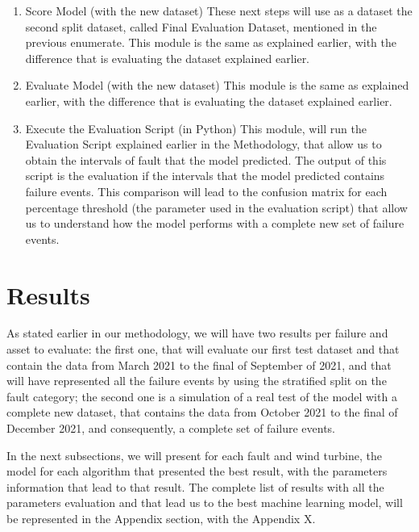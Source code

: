 \begin{enumerate}
    \item{Score Model (with the new dataset)}
These next steps will use as a dataset the second split dataset, called Final Evaluation Dataset, mentioned in the previous enumerate.
This module is the same as explained earlier, with the difference that is evaluating the dataset explained earlier.

    \item{Evaluate Model (with the new dataset)}
This module is the same as explained earlier, with the difference that is evaluating the dataset explained earlier.
    
    \item{Execute the Evaluation Script (in Python)}
This module, will run the Evaluation Script explained earlier in the Methodology, that allow us to obtain the intervals of fault that the model predicted. The output of this script is the evaluation if the intervals that the model predicted contains failure events. This comparison will lead to the confusion matrix for each percentage threshold (the parameter used in the evaluation script) that allow us to understand how the model performs with a complete new set of failure events.
\end{enumerate}



\section{Results}

As stated earlier in our methodology, we will have two results per failure and asset to evaluate: the first one, that will evaluate our first test dataset and that contain the data from March 2021 to the final of September of 2021, and that will have represented all the failure events by using the stratified split on the fault category; the second one is a simulation of a real test of the model with a complete new dataset, that contains the data from October 2021 to the final of December 2021, and consequently, a complete set of failure events.

In the next subsections, we will present for each fault and wind turbine, the model for each algorithm that presented the best result, with the parameters information that lead to that result.
The complete list of results with all the parameters evaluation and that lead us to the best machine learning model, will be represented in the Appendix section, with the Appendix X.

